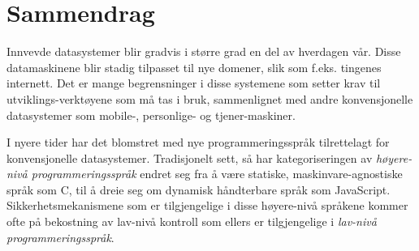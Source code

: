
\chapter{Sammendrag}
\label{chap:sammendrag}

Innvevde datasystemer blir gradvis i større grad en del av hverdagen vår.
Disse datamaskinene blir stadig tilpasset til nye domener, slik som f.eks. tingenes internett.
Det er mange begrensninger i disse systemene som setter krav til utviklings-verktøyene som må tas i bruk, sammenlignet med andre konvensjonelle datasystemer som mobile-, personlige- og tjener-maskiner.

I nyere tider har det blomstret med nye programmeringsspråk tilrettelagt for konvensjonelle datasystemer.
Tradisjonelt sett, så har kategoriseringen av \emph{høyere-nivå programmeringsspråk} endret seg fra å være statiske, maskinvare-agnostiske språk som C, til å dreie seg om dynamisk håndterbare språk som JavaScript.
Sikkerhetsmekanismene som er tilgjengelige i disse høyere-nivå språkene kommer ofte på bekostning av lav-nivå kontroll som ellers er tilgjengelige i \emph{lav-nivå programmeringsspråk}.